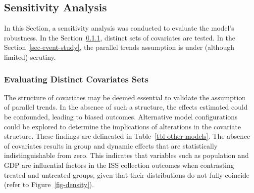 \documentclass[12pt, a4paper, twoside]{article}
\numberwithin{equation}{subsection} %
\begin{document}
\hypertarget{sec-sensitivity-analysis}{%
\subsection{Sensitivity Analysis}\label{sec-sensitivity-analysis}}

In this Section, a sensitivity analysis was conducted to evaluate the
model's robustness. In the Section~\ref{sec-covariates-sensitivity},
distinct sets of covariates are tested. In the
Section~\ref{sec-event-study}, the parallel trends assumption is under
(although limited) scrutiny.

\hypertarget{sec-covariates-sensitivity}{%
\subsubsection{Evaluating Distinct Covariates
Sets}\label{sec-covariates-sensitivity}}

The structure of covariates may be deemed essential to validate the
assumption of parallel trends. In the absence of such a structure, the
effects estimated could be confounded, leading to biased outcomes.
Alternative model configurations could be explored to determine the
implications of alterations in the covariate structure. These findings
are delineated in Table~\ref{tbl-other-models}. The absence of
covariates results in group and dynamic effects that are statistically
indistinguishable from zero. This indicates that variables such as
population and GDP are influential factors in the ISS collection
outcomes when contrasting treated and untreated groups, given that their
distributions do not fully coincide (refer to Figure~\ref{fig-density}).
\end{document}
